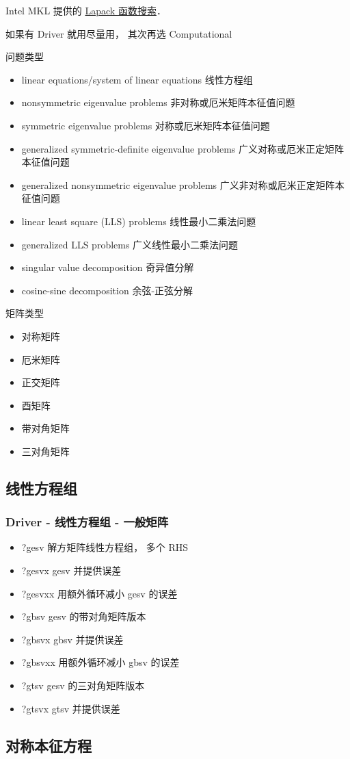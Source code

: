 
\begin{issues}
\issueDraft
\end{issues}


Intel MKL 提供的 \href{https://www.intel.com/content/www/us/en/developer/tools/oneapi/onemkl-function-finding-advisor.html}{Lapack 函数搜索}．

如果有 Driver 就用尽量用， 其次再选 Computational

问题类型
\begin{itemize}
\item linear equations/system of linear equations 线性方程组
\item nonsymmetric eigenvalue problems 非对称或厄米矩阵本征值问题
\item symmetric eigenvalue problems 对称或厄米矩阵本征值问题
\item generalized symmetric-definite eigenvalue problems 广义对称或厄米正定矩阵本征值问题
\item generalized nonsymmetric eigenvalue problems 广义非对称或厄米正定矩阵本征值问题
\item linear least square (LLS) problems 线性最小二乘法问题
\item generalized LLS problems 广义线性最小二乘法问题
\item singular value decomposition 奇异值分解
\item cosine-sine decomposition 余弦-正弦分解
\end{itemize}

矩阵类型
\begin{itemize}
\item 对称矩阵
\item 厄米矩阵
\item 正交矩阵
\item 酉矩阵
\item 带对角矩阵
\item 三对角矩阵
\end{itemize}


\subsection{线性方程组}
\subsubsection{Driver - 线性方程组 - 一般矩阵}
\begin{itemize}
\item ?gesv 解方矩阵线性方程组， 多个 RHS
\item ?gesvx gesv 并提供误差
\item ?gesvxx 用额外循环减小 gesv 的误差
\item ?gbsv gesv 的带对角矩阵版本
\item ?gbsvx gbsv 并提供误差
\item ?gbsvxx 用额外循环减小 gbsv 的误差
\item ?gtsv gesv 的三对角矩阵版本
\item ?gtsvx gtsv 并提供误差
\end{itemize}


\subsection{对称本征方程}
